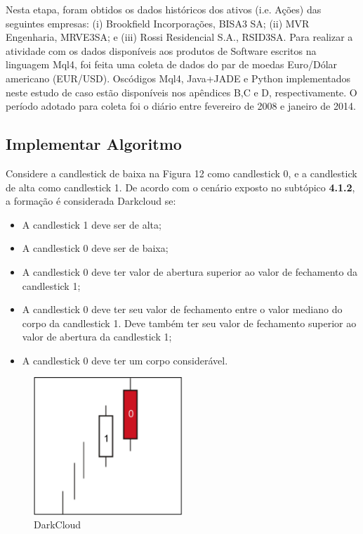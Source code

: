 Nesta etapa, foram obtidos os dados históricos dos ativos (i.e. Ações) das seguintes empresas: (i) Brookfield Incorporações, BISA3 SA; (ii) MVR Engenharia, MRVE3SA; e (iii) Rossi Residencial S.A., RSID3SA. Para realizar a atividade com os dados disponíveis aos produtos de Software escritos na linguagem Mql4, foi feita uma coleta de dados do par de moedas Euro/Dólar americano (EUR/USD). Oscódigos Mql4, Java+JADE e Python implementados neste estudo de caso estão disponíveis nos apêndices B,C e D, respectivamente. O período adotado para coleta foi o diário entre fevereiro de 2008 e janeiro de 2014.



\subsection{Implementar Algoritmo}

Considere a candlestick de baixa na Figura 12 como candlestick 0, e a candlestick de alta como candlestick 1. De acordo com o cenário exposto no subtópico \textbf{4.1.2}, a formação é considerada Darkcloud se:

\begin{itemize}
  \item A candlestick 1 deve ser de alta;
  \item A candlestick 0 deve ser de baixa;
  \item A candlestick 0 deve ter valor de abertura superior ao valor de fechamento da candlestick 1;
  \item A candlestick 0 deve ter seu valor de fechamento entre o valor mediano do corpo da candlestick 1. Deve também ter seu valor de fechamento superior ao valor de abertura da candlestick 1;
  \item A candlestick 0 deve ter um corpo considerável.
\end{itemize}

\begin{figure}[h]
\centering
\label{f12}
\includegraphics[width=0.5\textwidth]{figuras/f12}
\caption{DarkCloud}
\end{figure}

